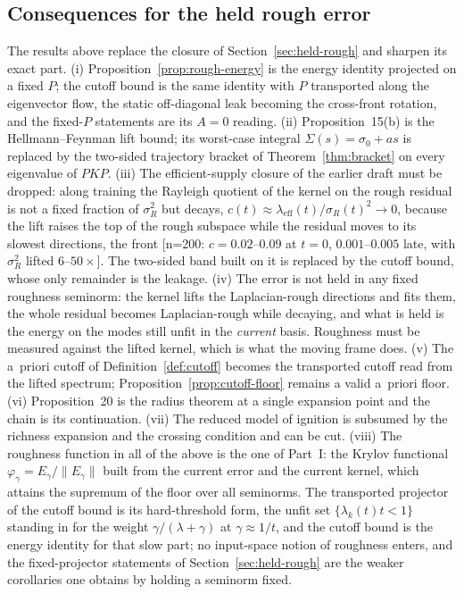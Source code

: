 \subsection{Consequences for the held rough error}
\label{ssec:chain-heldrough}

The results above replace the closure of Section~\ref{sec:held-rough} and
sharpen its exact part. (i) Proposition~\ref{prop:rough-energy} is the energy
identity projected on a fixed $P$; the cutoff bound is the same identity with
$P$ transported along the eigenvector flow, the static off-diagonal leak
becoming the cross-front rotation, and the fixed-$P$ statements are its $A=0$
reading. (ii) Proposition~15(b) is the Hellmann--Feynman lift bound; its
worst-case integral $\Sigma(s)=\sigma_0+as$ is replaced by the two-sided
trajectory bracket of Theorem~\ref{thm:bracket} on every eigenvalue of
$PKP$. (iii) The efficient-supply closure of the earlier draft must be dropped: along training the
Rayleigh quotient of the kernel on the rough residual is not a fixed fraction
of $\sigma_R^2$ but decays, $c(t)\approx\lambda_{\mathrm{eff}}(t)/\sigma_R(t)^2\to0$,
because the lift raises the top of the rough subspace while the residual moves
to its slowest directions, the front [n=200: $c=0.02$--$0.09$ at $t=0$,
$0.001$--$0.005$ late, with $\sigma_R^2$ lifted $6$--$50\times$]. The two-sided band
built on it is replaced by the cutoff bound, whose only remainder is the
leakage. (iv) The error is not held in any fixed roughness seminorm: the kernel
lifts the Laplacian-rough directions and fits them, the whole residual becomes
Laplacian-rough while decaying, and what is held is the energy on the modes
still unfit in the \emph{current} basis. Roughness must be measured against
the lifted kernel, which is what the moving frame does. (v) The a~priori
cutoff of Definition~\ref{def:cutoff} becomes the transported cutoff read from
the lifted spectrum; Proposition~\ref{prop:cutoff-floor} remains a valid
a~priori floor. (vi) Proposition~20 is the radius theorem at a single
expansion point and the chain is its continuation. (vii) The reduced model of
ignition is subsumed by the richness expansion and the crossing condition and
can be cut. (viii) The roughness function in all of the above is the one of
Part~I: the Krylov functional $\varphi_\gamma=E_\gamma/\|E_\gamma\|$ built from
the current error and the current kernel, which attains the supremum of the
floor over all seminorms. The transported projector of the cutoff bound is its
hard-threshold form, the unfit set $\{\lambda_k(t)t<1\}$ standing in for the
weight $\gamma/(\lambda+\gamma)$ at $\gamma\approx1/t$, and the cutoff bound is
the energy identity for that slow part; no input-space notion of roughness
enters, and the fixed-projector statements of Section~\ref{sec:held-rough}
are the weaker corollaries one obtains by holding a seminorm fixed.

